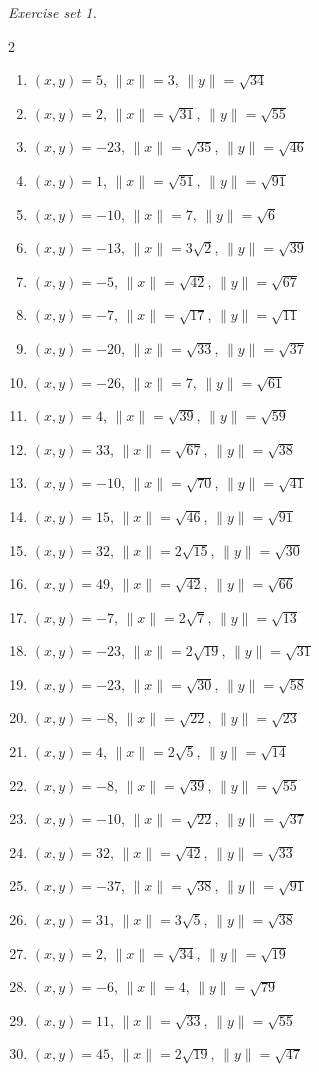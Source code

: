 \par\noindent\emph{Exercise set 1.}\nopagebreak
\begin{multicols}{2}\raggedright
\begin{enumerate}[label=\arabic*., leftmargin=*, itemsep=1pt]
\item $(x,y)=5$, $\|x\|=3$, $\|y\|=\sqrt{34}$
\item $(x,y)=2$, $\|x\|=\sqrt{31}$, $\|y\|=\sqrt{55}$
\item $(x,y)=-23$, $\|x\|=\sqrt{35}$, $\|y\|=\sqrt{46}$
\item $(x,y)=1$, $\|x\|=\sqrt{51}$, $\|y\|=\sqrt{91}$
\item $(x,y)=-10$, $\|x\|=7$, $\|y\|=\sqrt{6}$
\item $(x,y)=-13$, $\|x\|=3 \sqrt{2}$, $\|y\|=\sqrt{39}$
\item $(x,y)=-5$, $\|x\|=\sqrt{42}$, $\|y\|=\sqrt{67}$
\item $(x,y)=-7$, $\|x\|=\sqrt{17}$, $\|y\|=\sqrt{11}$
\item $(x,y)=-20$, $\|x\|=\sqrt{33}$, $\|y\|=\sqrt{37}$
\item $(x,y)=-26$, $\|x\|=7$, $\|y\|=\sqrt{61}$
\item $(x,y)=4$, $\|x\|=\sqrt{39}$, $\|y\|=\sqrt{59}$
\item $(x,y)=33$, $\|x\|=\sqrt{67}$, $\|y\|=\sqrt{38}$
\item $(x,y)=-10$, $\|x\|=\sqrt{70}$, $\|y\|=\sqrt{41}$
\item $(x,y)=15$, $\|x\|=\sqrt{46}$, $\|y\|=\sqrt{91}$
\item $(x,y)=32$, $\|x\|=2 \sqrt{15}$, $\|y\|=\sqrt{30}$
\item $(x,y)=49$, $\|x\|=\sqrt{42}$, $\|y\|=\sqrt{66}$
\item $(x,y)=-7$, $\|x\|=2 \sqrt{7}$, $\|y\|=\sqrt{13}$
\item $(x,y)=-23$, $\|x\|=2 \sqrt{19}$, $\|y\|=\sqrt{31}$
\item $(x,y)=-23$, $\|x\|=\sqrt{30}$, $\|y\|=\sqrt{58}$
\item $(x,y)=-8$, $\|x\|=\sqrt{22}$, $\|y\|=\sqrt{23}$
\item $(x,y)=4$, $\|x\|=2 \sqrt{5}$, $\|y\|=\sqrt{14}$
\item $(x,y)=-8$, $\|x\|=\sqrt{39}$, $\|y\|=\sqrt{55}$
\item $(x,y)=-10$, $\|x\|=\sqrt{22}$, $\|y\|=\sqrt{37}$
\item $(x,y)=32$, $\|x\|=\sqrt{42}$, $\|y\|=\sqrt{33}$
\item $(x,y)=-37$, $\|x\|=\sqrt{38}$, $\|y\|=\sqrt{91}$
\item $(x,y)=31$, $\|x\|=3 \sqrt{5}$, $\|y\|=\sqrt{38}$
\item $(x,y)=2$, $\|x\|=\sqrt{34}$, $\|y\|=\sqrt{19}$
\item $(x,y)=-6$, $\|x\|=4$, $\|y\|=\sqrt{79}$
\item $(x,y)=11$, $\|x\|=\sqrt{33}$, $\|y\|=\sqrt{55}$
\item $(x,y)=45$, $\|x\|=2 \sqrt{19}$, $\|y\|=\sqrt{47}$
\end{enumerate}
\end{multicols}
